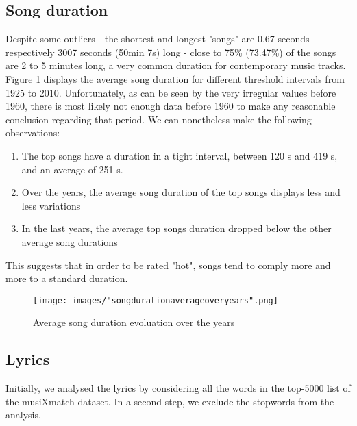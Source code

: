 \documentclass[11pt]{article}
\renewcommand\_{\textunderscore\allowbreak}
\begin{document}
\subsection{Song duration}
Despite some outliers - the shortest and longest "songs" are 0.67 seconds respectively 3007 seconds (50min 7s) long - close to 75\% (73.47\%) of the songs are 2 to 5 minutes long, a very common duration for contemporary music tracks.
Figure \ref{fig:song_duration_over_years} displays the average song duration for different threshold intervals from 1925 to 2010. 
Unfortunately, as can be seen by the very irregular values before 1960, there is most likely not enough data before 1960 to make any reasonable conclusion regarding that period. 
We can nonetheless make the following observations:
\begin{enumerate}
\itemsep 0mm
\item The top songs have a duration in a tight interval, between 120 s and 419 s, and an average of 251 s.
\item Over the years, the average song duration of the top songs displays less and less variations
\item In the last years, the average top songs duration dropped below the other average song durations
\end{enumerate}
This suggests that in order to be rated "hot", songs tend to comply more and more to a standard duration.

\begin{figure}[h!]
\centering
\captionsetup{width=1.0\textwidth}
\texttt{[image: images/"song\_duration\_average\_over\_years".png]}
\caption{Average song duration evoluation over the years}
\label{fig:song_duration_over_years}
\end{figure}

\subsection{Lyrics}
Initially, we analysed the lyrics by considering all the words in the top-5000 list of the musiXmatch dataset. In a second step, we exclude the stopwords from the analysis.
\end{document}
